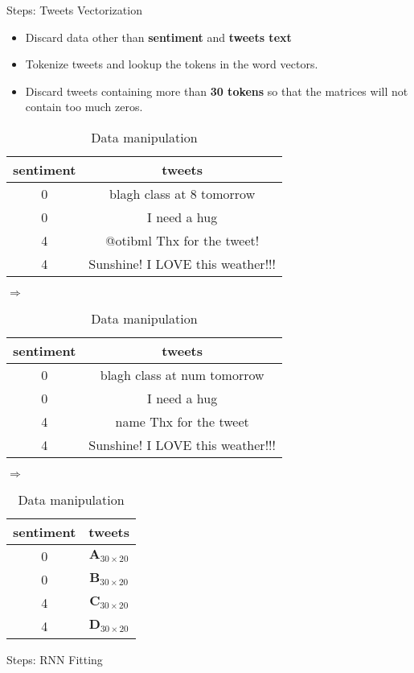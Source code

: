 \documentclass{beamer}
\begin{document}
\begin{frame}{Steps: Tweets Vectorization}
	\begin{itemize}
		\item Discard data other than \textbf{sentiment} and \textbf{tweets text}
		\item Tokenize tweets and lookup the tokens in the word vectors.
		\item Discard tweets containing more than \textbf{30 tokens} so that the matrices will not contain too much zeros.
		

	\end{itemize}
	\begin{table}[htpb]
		\scriptsize
		\centering
		\caption{Data manipulation}
		\label{tab:dataMan}
		\begin{tabular}{c c}
			sentiment & tweets \\
			\hline
			 0 & blagh class at 8 tomorrow  \\
			 0 & I need a hug  \\
			 4 & @otibml Thx for the tweet!  \\
			 4 & Sunshine! I LOVE this weather!!!  \\
		\end{tabular}
		$\Rightarrow$
		\begin{tabular}{c c}
			sentiment & tweets \\
			\hline
			 0 & blagh class at num tomorrow \\
			 0 & I need a hug \\
			 4 & name Thx for the tweet\\
			 4 & Sunshine! I LOVE this weather!!! \\
		\end{tabular}
		$\Rightarrow$
		\begin{tabular}{c c}
			sentiment & tweets \\
			\hline
			0 & $ \mathbf{A}_{ 30 \times 20 }  $ \\
			0 & $ \mathbf{B}_{ 30 \times 20 }  $ \\
			4 & $ \mathbf{C}_{ 30 \times 20 }  $ \\
			4 & $ \mathbf{D}_{ 30 \times 20 }  $ \\
		\end{tabular}
	\end{table}
	
\end{frame}

\begin{frame}{Steps: RNN Fitting}
		
\end{frame}
\end{document}
